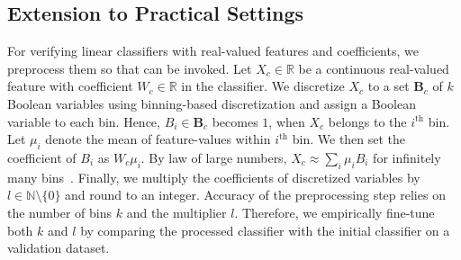 	
	\subsection{Extension to Practical Settings}\label{fvgm_sec:practical}
	For verifying linear classifiers with real-valued features and coefficients, we preprocess them so that {\fvgm} can be invoked. Let $ X_c \in \mathbb{R} $ be a continuous real-valued feature with coefficient $ W_c \in \mathbb{R} $ in the classifier. We discretize $ X_c $ to a set $ \mathbf{B}_{c} $ of $ k $ Boolean variables using binning-based discretization and assign a Boolean variable to each bin. Hence, $ B_i \in \mathbf{B}_{c} $ becomes $ 1 $, when $ X_c $ belongs to the $ i^\text{th} $ bin. Let $ \mu_i $ denote the mean of feature-values within $ i^\text{th} $ bin. We then set the coefficient of $ B_i $ as $ W_c\mu_i $. By law of large numbers, $ X_c \approx \sum_i \mu_iB_i $ for infinitely many bins~\cite{grimmett2020probability}. Finally, we multiply the coefficients of discretized variables by $ l \in \mathbb{N} \setminus \{0\} $ and round to an integer. Accuracy of the preprocessing step relies on the number of bins $ k $ and the multiplier $ l $. Therefore, we empirically fine-tune both $ k $ and $ l $ by comparing  the processed classifier with the initial classifier on a validation dataset.
\begin{comment}
	\begin{figure}
		\centering
		\subfloat[Exploration tree of stochastic sub-set sum problem.]{	\texttt{[image: figures/exploration\_tree\_DP]}\label{fvgm_fig:example_dp}}
		\subfloat[Bayesian network]{\texttt{[image: figures/example\_BN]}\label{fvgm_fig:example_BN}}
		\subfloat[Exploration tree of stochastic sub-set sum problem with Bayesian network]{\texttt{[image: figures/exploration\_tree\_DP\_BN]}	\label{fvgm_fig:example_dp_BN}
		}
		
	\end{figure}
\end{comment}


